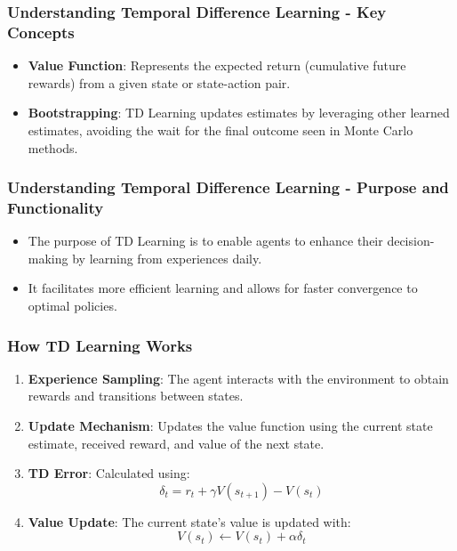 \documentclass[aspectratio=169]{beamer}
\begin{document}
\begin{frame}[fragile]
    \frametitle{Understanding Temporal Difference Learning - Key Concepts}
    \begin{itemize}
        \item \textbf{Value Function}: Represents the expected return (cumulative future rewards) from a given state or state-action pair.
        \item \textbf{Bootstrapping}: TD Learning updates estimates by leveraging other learned estimates, avoiding the wait for the final outcome seen in Monte Carlo methods.
    \end{itemize}
\end{frame}

\begin{frame}[fragile]
    \frametitle{Understanding Temporal Difference Learning - Purpose and Functionality}
    \begin{itemize}
        \item The purpose of TD Learning is to enable agents to enhance their decision-making by learning from experiences daily.
        \item It facilitates more efficient learning and allows for faster convergence to optimal policies.
    \end{itemize}
\end{frame}

\begin{frame}[fragile]
    \frametitle{How TD Learning Works}
    \begin{enumerate}
        \item \textbf{Experience Sampling}: The agent interacts with the environment to obtain rewards and transitions between states.
        \item \textbf{Update Mechanism}: Updates the value function using the current state estimate, received reward, and value of the next state.
        \item \textbf{TD Error}: Calculated using:
        \begin{equation}
        \delta_t = r_t + \gamma V(s_{t+1}) - V(s_t)
        \end{equation}
        \item \textbf{Value Update}: The current state's value is updated with:
        \begin{equation}
        V(s_t) \leftarrow V(s_t) + \alpha \delta_t
        \end{equation}
    \end{enumerate}
\end{frame}
\end{document}
